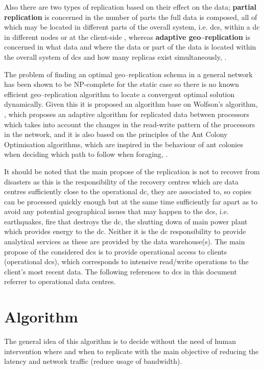 \documentclass[english]{article}
\begin{document}
	Also there are two types of replication based on their effect on the data; {\bf partial replication} is concerned in the number of parts the full data is composed, all of which may be located in different parts of the overall system, i.e. \glspl{dc}, within a \gls{dc} in different nodes or at the client-side \cite{Briquemont2015a, Briquemont2014a, Serrano2007a}, whereas {\bf adaptive geo--replication} is concerned in what data and where the data or part of the data is located within the overall system of \glspl{dc} and how many replicas exist simultaneously, \cite{Jeon2014a, KingsyGrace2013a, Wang2012a, Abad2011a, Abdul-Wahid2007a, Loukopoulos2004a}.
	
	The problem of finding an optimal geo--replication schema in a general network has been shown to be NP-complete for the static case \cite{Apers1988a,Wolfson1997a,Wolfson1991a} so there is no known efficient geo--replication algorithm to locate a convergent optimal solution dynamically. Given this it is proposed an algorithm base on Wolfson's algorithm, \cite{Wolfson1990a}, which proposes an adaptive algorithm for replicated data between processors which takes into account the changes in the read-write pattern of the processors in the network, and it is also based on the principles of the Ant Colony Optimisation algorithms, which are inspired in the behaviour of ant colonies when deciding which path to follow when foraging, \cite{dorigo1992a}.
	
	It should be noted that the main propose of the replication is not to recover from disasters as this is the responsibility of the recovery centres which are data centres sufficiently close to the operational \gls{dc}, they are associated to, so copies can be processed quickly enough but at the same time sufficiently far apart as to avoid any potential geographical issues that may happen to the \glspl{dc}, i.e. earthquakes, fire that destroys the \gls{dc}, the shutting down of main power plant which provides energy to the \gls{dc}. Neither it is the \gls{dc} responsibility to provide analytical services as these are provided by the data warehouse(s). The main propose of the considered \glspl{dc} is to provide operational access to clients (operational \glspl{dc}), which corresponds to intensive read/write operations to the client's most recent data. The following references to \glspl{dc} in this document referrer to operational data centres.


\section{Algorithm}
The general idea of this algorithm is to decide without the need of human intervention where and when to replicate with the main objective of reducing the latency and network traffic (reduce usage of bandwidth).
\end{document}
